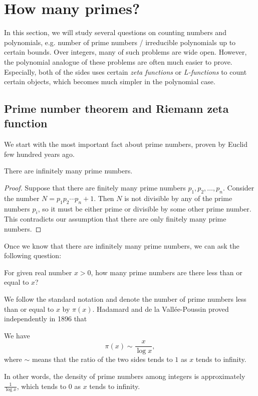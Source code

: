 \section{How many primes?}
\label{sec:how-many-primes}

In this section, we will study several questions on counting numbers and polynomials, e.g. number of prime numbers / irreducible polynomials up to certain bounds.
Over integers, many of such problems are wide open.
However, the polynomial analogue of these problems are often much easier to prove.
Especially, both of the sides uses certain \emph{zeta functions} or \emph{L-functions} to count certain objects, which becomes much simpler in the polynomial case.

\subsection{Prime number theorem and Riemann zeta function}
\label{subsec:prime-number-theorem}

We start with the most important fact about prime numbers, proven by Euclid few hundred years ago.
\begin{theorem}[Euclid]
    \label{thm:euclid}
    There are infinitely many prime numbers.
\end{theorem}
\begin{proof}
    Suppose that there are finitely many prime numbers $p_1, p_2, \dots, p_n$.
    Consider the number $N = p_1 p_2 \cdots p_n + 1$.
    Then $N$ is not divisible by any of the prime numbers $p_i$, so it must be either prime or divisible by some other prime number.
    This contradicts our assumption that there are only finitely many prime numbers.
\end{proof}

Once we know that there are infinitely many prime numbers, we can ask the following question:

\begin{myquote}
    For given real number $x > 0$, how many prime numbers are there less than or equal to $x$?
\end{myquote}

We follow the standard notation and denote the number of prime numbers less than or equal to $x$ by $\pi(x)$.
Hadamard and de la Vall\'ee-Poussin proved independently in 1896 that
\begin{theorem}
    \label{thm:prime-number-theorem}
    We have
    \[
        \pi(x) \sim \frac{x}{\log x},
    \]
    where $\sim$ means that the ratio of the two sides tends to $1$ as $x$ tends to infinity.
\end{theorem}
In other words, the density of prime numbers among integers is approximately $\frac{1}{\log x}$, which tends to $0$ as $x$ tends to infinity.

